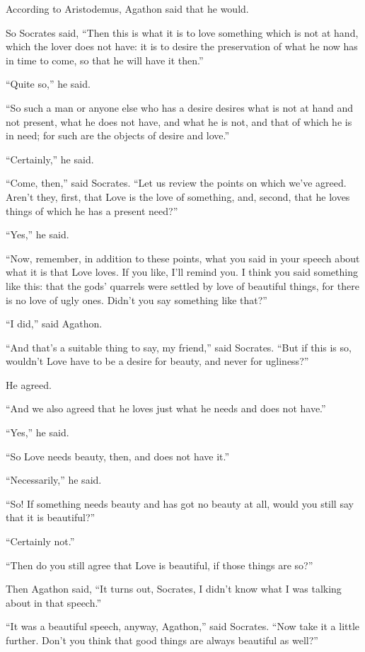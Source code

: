 According to Aristodemus, Agathon said that he would.

So Socrates said, “Then this is what it is to love something which is
not at hand, which the lover does not have: it is to desire the
preservation of what he now has in time to come, so that he will have it
then.” 

“Quite so,” he said.

“So such a man or anyone else who has a desire desires what is not at
hand and not present, what he does not have, and what he is not, and
that of which he is in need; for such are the objects of desire and
love.”

“Certainly,” he said.

“Come, then,” said Socrates. “Let us review the points on which we've
agreed. Aren't they, first, that Love is the love of something, and,
second, that he loves things of which he has a present need?”

“Yes,” he said.

“Now, remember, in addition to these points, what you said in your
speech about what it is that Love loves. If you like, I'll remind you. I
think you said something like this: that the gods' quarrels were settled
by love of beautiful things, for there is no love of ugly
ones. Didn't you say
something like that?”

“I did,” said Agathon.

“And that's a suitable thing to say, my friend,” said Socrates. “But if
this is so, wouldn't Love have to be a desire for beauty, and never for
ugliness?”

He agreed. 

“And we also agreed that he loves just what he needs and does not have.”

“Yes,” he said.

“So Love needs beauty, then, and does not have it.”

“Necessarily,” he said.

“So! If something needs beauty and has got no beauty at all, would you
still say that it is beautiful?”

“Certainly not.”

“Then do you still agree that Love is beautiful, if those things are
so?”

 Then Agathon said, “It turns out, Socrates, I didn't know what I
was talking about in that speech.”

“It was a beautiful speech, anyway, Agathon,” said Socrates. “Now take
it a little further. Don't you think that good things are always
beautiful as well?”

